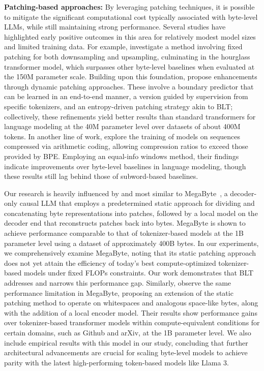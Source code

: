 \textbf{Patching-based approaches:} By leveraging patching techniques, it is possible to mitigate the significant computational cost typically associated with byte-level LLMs, while still maintaining strong performance. Several studies have highlighted early positive outcomes in this area for relatively modest model sizes and limited training data. For example, \cite{nawrot-etal-2022-hierarchical} investigate a method involving fixed patching for both downsampling and upsampling, culminating in the hourglass transformer model, which surpasses other byte-level baselines when evaluated at the 150M parameter scale. Building upon this foundation, \cite{nawrot-etal-2023-efficient} propose enhancements through dynamic patching approaches. These involve a boundary predictor that can be learned in an end-to-end manner, a version guided by supervision from specific tokenizers, and an entropy-driven patching strategy akin to {\textsc BLT}; collectively, these refinements yield better results than standard transformers for language modeling at the 40M parameter level over datasets of about 400M tokens. In another line of work, \cite{lester2024training} explore the training of models on sequences compressed via arithmetic coding, allowing compression ratios to exceed those provided by BPE. Employing an equal-info windows method, their findings indicate improvements over byte-level baselines in language modeling, though these results still lag behind those of subword-based baselines.

Our research is heavily influenced by and most similar to MegaByte~\citep{yu2023megabyte}, a decoder-only causal LLM that employs a predetermined static approach for dividing and concatenating byte representations into patches, followed by a local model on the decoder end that reconstructs patches back into bytes. MegaByte is shown to achieve performance comparable to that of tokenizer-based models at the 1B parameter level using a dataset of approximately 400B bytes. In our experiments, we comprehensively examine MegaByte, noting that its static patching approach does not yet attain the efficiency of today’s best compute-optimized tokenizer-based models under fixed FLOPs constraints. Our work demonstrates that {\textsc BLT} addresses and narrows this performance gap. Similarly, \cite{slagle2024spacebyte} observe the same performance limitation in MegaByte, proposing an extension of the static patching method to operate on whitespaces and analogous space-like bytes, along with the addition of a local encoder model. Their results show performance gains over tokenizer-based transformer models within compute-equivalent conditions for certain domains, such as Github and arXiv, at the 1B parameter level. We also include empirical results with this model in our study, concluding that further architectural advancements are crucial for scaling byte-level models to achieve parity with the latest high-performing token-based models like Llama 3.

